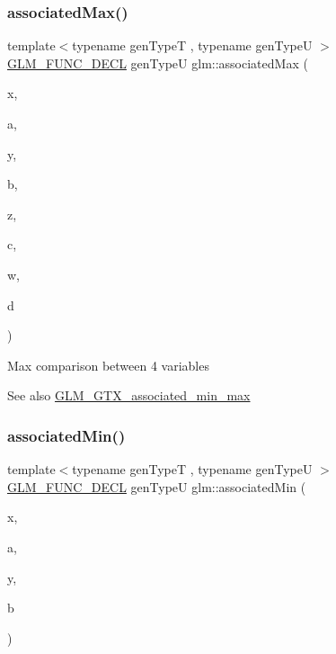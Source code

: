 \subsubsection{\texorpdfstring{associated\+Max()}{associatedMax()}\hspace{0.1cm}{\footnotesize\ttfamily [3/3]}}
{\footnotesize\ttfamily template$<$typename gen\+TypeT , typename gen\+TypeU $>$ \\
\hyperlink{setup_8hpp_ab2d052de21a70539923e9bcbf6e83a51}{G\+L\+M\+\_\+\+F\+U\+N\+C\+\_\+\+D\+E\+CL} gen\+TypeU glm\+::associated\+Max (\begin{DoxyParamCaption}\item[{const gen\+TypeT \&}]{x,  }\item[{const gen\+TypeU \&}]{a,  }\item[{const gen\+TypeT \&}]{y,  }\item[{const gen\+TypeU \&}]{b,  }\item[{const gen\+TypeT \&}]{z,  }\item[{const gen\+TypeU \&}]{c,  }\item[{const gen\+TypeT \&}]{w,  }\item[{const gen\+TypeU \&}]{d }\end{DoxyParamCaption})}

Max comparison between 4 variables \begin{DoxySeeAlso}{See also}
\hyperlink{group__gtx__associated__min__max}{G\+L\+M\+\_\+\+G\+T\+X\+\_\+associated\+\_\+min\+\_\+max} 
\end{DoxySeeAlso}
\mbox{\label{group__gtx__associated__min__max_ga47bdb60409768f3d315bc5a1f739810a}} 
\subsubsection{\texorpdfstring{associated\+Min()}{associatedMin()}\hspace{0.1cm}{\footnotesize\ttfamily [1/3]}}
{\footnotesize\ttfamily template$<$typename gen\+TypeT , typename gen\+TypeU $>$ \\
\hyperlink{setup_8hpp_ab2d052de21a70539923e9bcbf6e83a51}{G\+L\+M\+\_\+\+F\+U\+N\+C\+\_\+\+D\+E\+CL} gen\+TypeU glm\+::associated\+Min (\begin{DoxyParamCaption}\item[{const gen\+TypeT \&}]{x,  }\item[{const gen\+TypeU \&}]{a,  }\item[{const gen\+TypeT \&}]{y,  }\item[{const gen\+TypeU \&}]{b }\end{DoxyParamCaption})}

